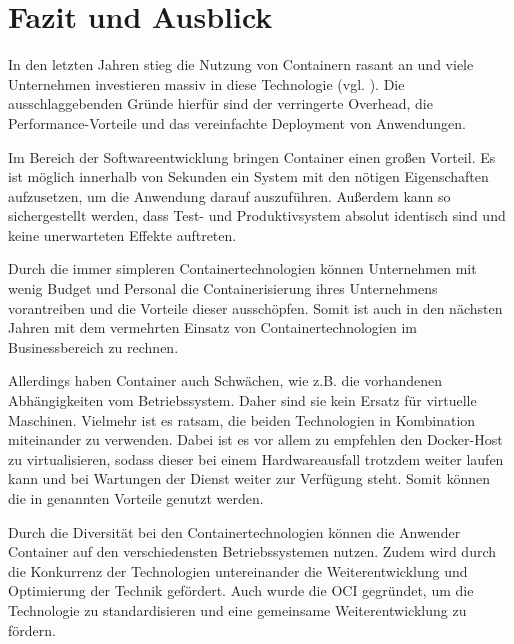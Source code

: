 \section{Fazit und Ausblick} 
\label{sec:Fazit}
In den letzten Jahren stieg die Nutzung von Containern rasant an und viele Unternehmen investieren massiv in diese Technologie (vgl. ). 
Die ausschlaggebenden Gründe hierfür sind der verringerte Overhead, die Performance-Vorteile und das vereinfachte Deployment von Anwendungen. 

Im Bereich der Softwareentwicklung bringen Container einen großen Vorteil. 
Es ist möglich innerhalb von Sekunden ein System mit den nötigen Eigenschaften aufzusetzen, um die Anwendung darauf auszuführen. 
Außerdem kann so sichergestellt werden, dass Test- und Produktivsystem absolut identisch sind und keine unerwarteten Effekte auftreten. 

Durch die immer simpleren Containertechnologien können Unternehmen mit wenig Budget und Personal die Containerisierung ihres Unternehmens vorantreiben und die Vorteile dieser ausschöpfen. 
Somit ist auch in den nächsten Jahren mit dem vermehrten Einsatz von Containertechnologien im Businessbereich zu rechnen. 

Allerdings haben Container auch Schwächen, wie z.B. die vorhandenen Abhängigkeiten vom Betriebssystem.
Daher sind sie kein Ersatz für virtuelle Maschinen. Vielmehr ist es ratsam, die beiden Technologien in Kombination miteinander zu verwenden. 
Dabei ist es vor allem zu empfehlen den Docker-Host zu virtualisieren, sodass dieser bei einem Hardwareausfall trotzdem weiter laufen kann und bei Wartungen der Dienst weiter zur Verfügung steht. 
Somit können die in  genannten Vorteile genutzt werden.

Durch die Diversität bei den Containertechnologien können die Anwender Container auf den verschiedensten Betriebssystemen nutzen.
Zudem wird durch die Konkurrenz der Technologien untereinander die Weiterentwicklung und Optimierung der Technik gefördert. 
Auch wurde die \ac{OCI} gegründet, um die Technologie zu standardisieren und eine gemeinsame Weiterentwicklung zu fördern.

